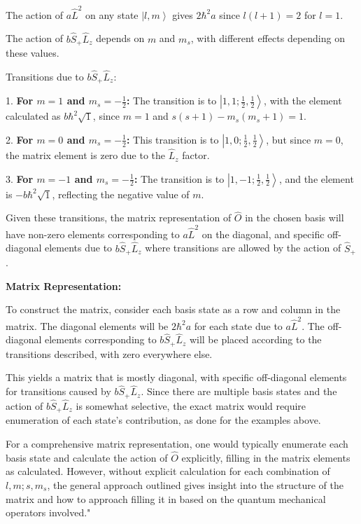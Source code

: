 The action of \( a\hat{L}^2 \) on any state \( \left|l, m \right> \) gives \( 2\hbar^2a \) since \( l(l+1) = 2 \) for \( l=1 \).

The action of \( b\hat{S}_{+}\hat{L}_{z} \) depends on \( m \) and \( m_{s} \), with different effects depending on these values.

Transitions due to \( b\hat{S}_{+}\hat{L}_{z} \):

1. \textbf{For \( m = 1 \) and \( m_{s} = -\frac{1}{2} \):} The transition is to \( \left|1, 1; \frac{1}{2}, \frac{1}{2} \right> \), with the element calculated as \( b\hbar^2 \sqrt{1} \), since \( m = 1 \) and \( s(s+1) - m_{s}(m_{s}+1) = 1 \).

2. \textbf{For \( m = 0 \) and \( m_{s} = -\frac{1}{2} \):} This transition is to \( \left|1, 0; \frac{1}{2}, \frac{1}{2} \right> \), but since \( m = 0 \), the matrix element is zero due to the \( \hat{L}_{z} \) factor.

3. \textbf{For \( m = -1 \) and \( m_{s} = -\frac{1}{2} \):} The transition is to \( \left|1, -1; \frac{1}{2}, \frac{1}{2} \right> \), and the element is \( -b\hbar^2 \sqrt{1} \), reflecting the negative value of \( m \).

Given these transitions, the matrix representation of \( \hat{O} \) in the chosen basis will have non-zero elements corresponding to \( a\hat{L}^2 \) on the diagonal, and specific off-diagonal elements due to \( b\hat{S}_{+}\hat{L}_{z} \) where transitions are allowed by the action of \( \hat{S}_{+} \).

\textbf{Matrix Representation:}

To construct the matrix, consider each basis state as a row and column in the matrix. The diagonal elements will be \( 2\hbar^2a \) for each state due to \( a\hat{L}^2 \). The off-diagonal elements corresponding to \( b\hat{S}_{+}\hat{L}_{z} \) will be placed according to the transitions described, with zero everywhere else.

This yields a matrix that is mostly diagonal, with specific off-diagonal elements for transitions caused by \( b\hat{S}_{+}\hat{L}_{z} \). Since there are multiple basis states and the action of \( b\hat{S}_{+}\hat{L}_{z} \) is somewhat selective, the exact matrix would require enumeration of each state's contribution, as done for the examples above.

For a comprehensive matrix representation, one would typically enumerate each basis state and calculate the action of \( \hat{O} \) explicitly, filling in the matrix elements as calculated. However, without explicit calculation for each combination of \( l, m; s, m_{s} \), the general approach outlined gives insight into the structure of the matrix and how to approach filling it in based on the quantum mechanical operators involved."

